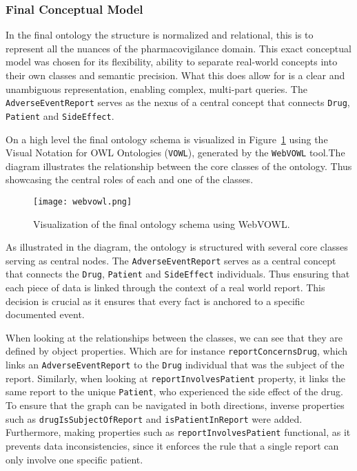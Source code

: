 \subsubsection{Final Conceptual Model}


In the final ontology the structure is normalized and relational, this is to represent all the nuances of the pharmacovigilance domain. This exact conceptual model was chosen for its flexibility, ability to separate real-world concepts into their own classes and semantic precision. What this does allow for is a clear and unambiguous representation, enabling complex, multi-part queries. The \texttt{AdverseEventReport} serves as the nexus of a central concept that connects \texttt{Drug}, \texttt{Patient} and \texttt{SideEffect}.

On a high level the final ontology schema is visualized in Figure~\ref{fig:vowl_visualization} using the Visual Notation for OWL Ontologies (\texttt{VOWL}), generated by the \texttt{WebVOWL} tool.The diagram illustrates the relationship between the core classes of the ontology. Thus showcasing the central roles of each and one of the classes.

\begin{figure}[H]
\centering
\texttt{[image: webvowl.png]} %
\caption{Visualization of the final ontology schema using WebVOWL.}
\label{fig:vowl_visualization}
\end{figure}

As illustrated in the diagram, the ontology is structured with several core classes serving as central nodes. The \texttt{Adverse\-Event\-Report} serves as a central concept that connects the \texttt{Drug}, \texttt{Patient} and \texttt{Side\-Effect} individuals. Thus ensuring that each piece of data is linked through the context of a real world report. This decision is crucial as it ensures that every fact is anchored to a specific documented event.

When looking at the relationships between the classes, we can see that they are defined by object properties. Which are for instance \texttt{report\-Concerns\-Drug}, which links an \texttt{Adverse\-Event\-Report} to the \texttt{Drug} individual that was the subject of the report. Similarly, when looking at \texttt{report\-Involves\-Patient} property, it links the same report to the unique \texttt{Patient}, who experienced the side effect of the drug. To ensure that the graph can be navigated in both directions, inverse properties such as \texttt{drug\-Is\-Subject\-Of\-Report} and \texttt{is\-Patient\-In\-Report} were added. Furthermore, making properties such as \texttt{report\-Involves\-Patient} functional, as it prevents data inconsistencies, since it enforces the rule that a single report can only involve one specific patient.

